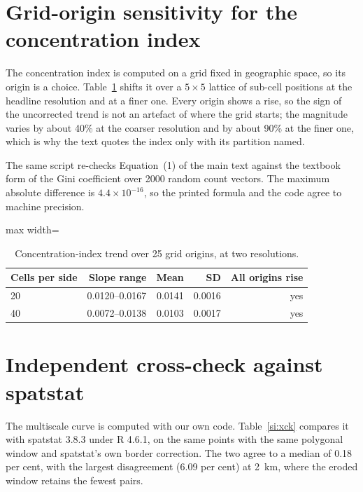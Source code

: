 \documentclass[fleqn,10pt]{wlpeerj}
\begin{document}
\section{Grid-origin sensitivity for the concentration index}
\label{si:origin}

The concentration index is computed on a grid fixed in geographic space, so its origin is a
choice. Table~\ref{si:origin} shifts it over a $5\times5$ lattice of sub-cell positions at the
headline resolution and at a finer one. Every origin shows a rise, so the sign of the uncorrected
trend is not an artefact of where the grid starts; the magnitude varies by about 40\% at the
coarser resolution and by about 90\% at the finer one, which is why the text quotes the index
only with its partition named.

The same script re-checks Equation~(1) of the main text against the textbook form of the Gini
coefficient over \num{2000} random count vectors. The maximum absolute difference is
$4.4\times10^{-16}$, so the printed formula and the code agree to machine precision.

\begin{table}[H]
\centering
\caption{Concentration-index trend over \num{25} grid origins, at two resolutions.}
\label{si:origintab}
\small
\begin{adjustbox}{max width=\linewidth}
\begin{tabular}{lrrrr}
\toprule
Cells per side & Slope range & Mean & SD & All origins rise \\
\midrule
20 & 0.0120--0.0167 & 0.0141 & 0.0016 & yes \\
40 & 0.0072--0.0138 & 0.0103 & 0.0017 & yes \\
\bottomrule
\end{tabular}
\end{adjustbox}
\end{table}

\section{Independent cross-check against \textsf{spatstat}}
\label{si:crosscheck}

The multiscale curve is computed with our own code. Table~\ref{si:xck} compares it with
\textsf{spatstat} 3.8.3 under R 4.6.1, on the same points with the same polygonal window and
\textsf{spatstat}'s own border correction. The two agree to a median of 0.18 per cent,
with the largest disagreement (6.09 per cent) at \SI{2}{\kilo\meter}, where the eroded
window retains the fewest pairs.
\end{document}
